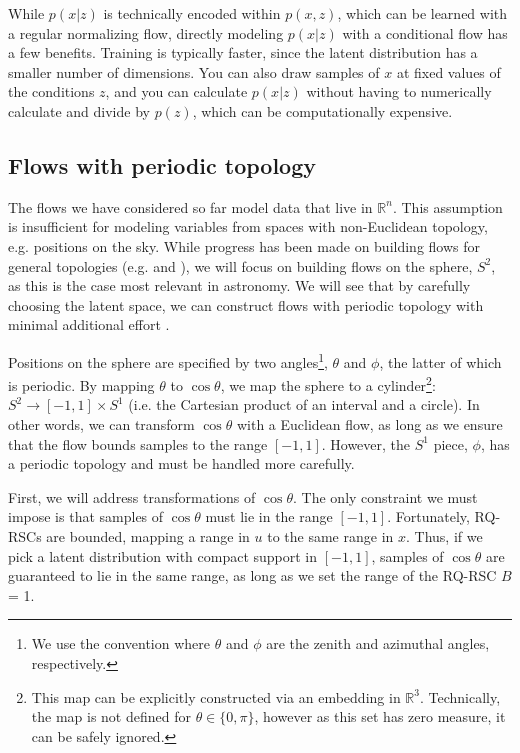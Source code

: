 \documentclass[twocolumn,twocolappendix]{aastex631}
\newcommand{\R}{\mathbb{R}}
\begin{document}
While $p(x|z)$ is technically encoded within $p(x,z)$, which can be learned with a regular normalizing flow, directly modeling $p(x|z)$ with a conditional flow has a few benefits.
Training is typically faster, since the latent distribution has a smaller number of dimensions.
You can also draw samples of $x$ at fixed values of the conditions $z$, and you can calculate $p(x|z)$ without having to numerically calculate and divide by $p(z)$, which can be computationally expensive.

\subsection{Flows with periodic topology}
\label{sec:periodic}

The flows we have considered so far model data that live in $\R^n$.
This assumption is insufficient for modeling variables from spaces with non-Euclidean topology, e.g. positions on the sky.
While progress has been made on building flows for general topologies (e.g. \citealt{gemici2016} and \citealt{falorsi2019}), we will focus on building flows on the sphere, $S^2$, as this is the case most relevant in astronomy.
We will see that by carefully choosing the latent space, we can construct flows with periodic topology with minimal additional effort \citep{rezende2020}.

Positions on the sphere are specified by two angles\footnote{
We use the convention where $\theta$ and $\phi$ are the zenith and azimuthal angles, respectively.
},
$\theta$ and $\phi$, the latter of which is periodic.
By mapping $\theta$ to $\cos\theta$, we map the sphere to a cylinder\footnote{
This map can be explicitly constructed via an embedding in $\R^3$.
Technically, the map is not defined for $\theta \in \{0, \pi\}$, however as this set has zero measure, it can be safely ignored.}:
$S^2 \to [-1,1] \times S^1$ (i.e. the Cartesian product of an interval and a circle).
In other words, we can transform $\cos\theta$ with a Euclidean flow, as long as we ensure that the flow bounds samples to the range $[-1, 1]$.
However, the $S^1$ piece, $\phi$, has a periodic topology and must be handled more carefully.

First, we will address transformations of $\cos\theta$.
The only constraint we must impose is that samples of $\cos\theta$ must lie in the range $[-1, 1]$.
Fortunately, RQ-RSCs are bounded, mapping a range in $u$ to the same range in $x$.
Thus, if we pick a latent distribution with compact support in $[-1, 1]$, samples of $\cos\theta$ are guaranteed to lie in the same range, as long as we set the range of the RQ-RSC $B$ = 1.
\end{document}
